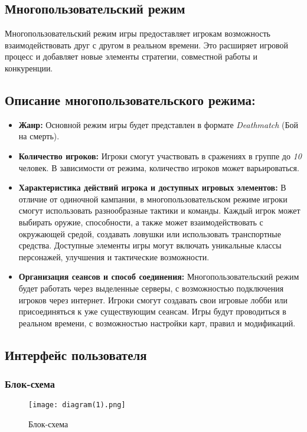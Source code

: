 \documentclass{article}
\begin{document}
\begin{itemize}
\subsection{Многопользовательский режим}
Многопользовательский режим игры предоставляет игрокам возможность взаимодействовать друг с другом в реальном времени. Это расширяет игровой процесс и добавляет новые элементы стратегии, совместной работы и конкуренции.
\subsection{Описание многопользовательского режима:}

\begin{itemize}
    \item \textbf{Жанр:} Основной режим игры будет представлен в формате \textit{Deathmatch} (Бой на смерть).
    
    \item \textbf{Количество игроков:} Игроки смогут участвовать в сражениях в группе до \textit{10} человек. В зависимости от режима, количество игроков может варьироваться.
    
    \item \textbf{Характеристика действий игрока и доступных игровых элементов:} В отличие от одиночной кампании, в многопользовательском режиме игроки смогут использовать разнообразные тактики и команды. Каждый игрок может выбирать оружие, способности, а также может взаимодействовать с окружающей средой, создавать ловушки или использовать транспортные средства. Доступные элементы игры могут включать уникальные классы персонажей, улучшения и тактические возможности.
    
    \item \textbf{Организация сеансов и способ соединения:} Многопользовательский режим будет работать через выделенные серверы, с возможностью подключения игроков через интернет. Игроки смогут создавать свои игровые лобби или присоединяться к уже существующим сеансам. Игры будут проводиться в реальном времени, с возможностью настройки карт, правил и модификаций.
\end{itemize}

\clearpage
\subsection{Интерфейс пользователя}

\subsubsection{Блок-схема}
\begin{figure}[!htbp] 
    \centering 
    \texttt{[image: diagram(1).png]} 
    \caption{Блок-схема} 
\end{figure}


\end{itemize}
\end{document}
